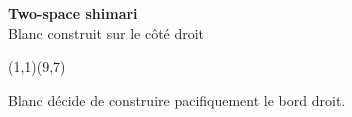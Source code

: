 \documentclass[preview, border=0pt, varwidth=false]{standalone}
\begin{document}
	\setgounit{0.6cm} 
	
	\parbox[c][14.65cm][c]{10.2cm}{
		\centering
		
		{\Large\textbf{Two-space shimari} \\ Blanc construit sur le côté droit}
		\vspace{3em}
		
		\begin{psgopartialboard}{(1,1)(9,7)}
			\pass
		\end{psgopartialboard}
		
		\vspace{1em}
		Blanc décide de construire pacifiquement le bord droit.
	}
	
\end{document}
